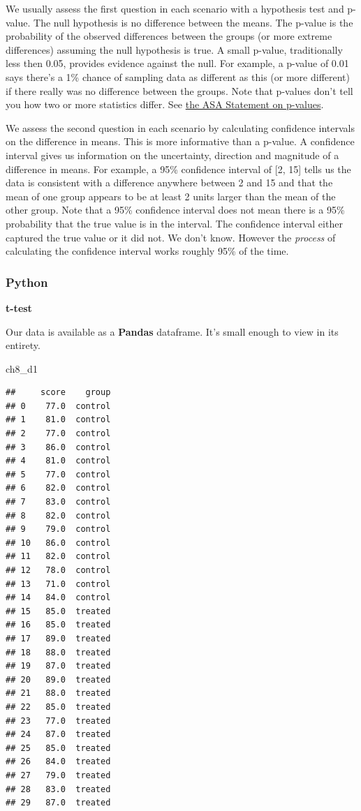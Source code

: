 \documentclass[
]{book}
\newenvironment{Shaded}{\begin{snugshade}}{\end{snugshade}}
\newcommand{\NormalTok}[1]{#1}
\begin{document}
We usually assess the first question in each scenario with a hypothesis test and p-value. The null hypothesis is no difference between the means. The p-value is the probability of the observed differences between the groups (or more extreme differences) assuming the null hypothesis is true. A small p-value, traditionally less then 0.05, provides evidence against the null. For example, a p-value of 0.01 says there's a 1\% chance of sampling data as different as this (or more different) if there really was no difference between the groups. Note that p-values don't tell you how two or more statistics differ. See \href{https://www.tandfonline.com/doi/full/10.1080/00031305.2016.1154108\#_i28}{the ASA Statement on p-values}.

We assess the second question in each scenario by calculating confidence intervals on the difference in means. This is more informative than a p-value. A confidence interval gives us information on the uncertainty, direction and magnitude of a difference in means. For example, a 95\% confidence interval of {[}2, 15{]} tells us the data is consistent with a difference anywhere between 2 and 15 and that the mean of one group appears to be at least 2 units larger than the mean of the other group. Note that a 95\% confidence interval does not mean there is a 95\% probability that the true value is in the interval. The confidence interval either captured the true value or it did not. We don't know. However the \emph{process} of calculating the confidence interval works roughly 95\% of the time.

\hypertarget{python-47}{%
\subsubsection*{Python}\label{python-47}}

\textbf{t-test}

Our data is available as a \textbf{Pandas} dataframe. It's small enough to view in its entirety.

\begin{Shaded}
\begin{Highlighting}[]
\NormalTok{ch8\_d1}
\end{Highlighting}
\end{Shaded}

\begin{verbatim}
##     score    group
## 0    77.0  control
## 1    81.0  control
## 2    77.0  control
## 3    86.0  control
## 4    81.0  control
## 5    77.0  control
## 6    82.0  control
## 7    83.0  control
## 8    82.0  control
## 9    79.0  control
## 10   86.0  control
## 11   82.0  control
## 12   78.0  control
## 13   71.0  control
## 14   84.0  control
## 15   85.0  treated
## 16   85.0  treated
## 17   89.0  treated
## 18   88.0  treated
## 19   87.0  treated
## 20   89.0  treated
## 21   88.0  treated
## 22   85.0  treated
## 23   77.0  treated
## 24   87.0  treated
## 25   85.0  treated
## 26   84.0  treated
## 27   79.0  treated
## 28   83.0  treated
## 29   87.0  treated
\end{verbatim}
\end{document}
